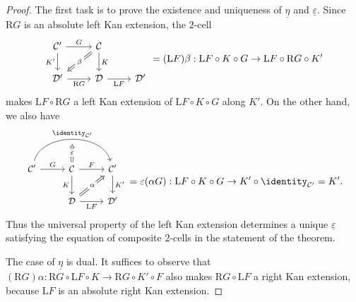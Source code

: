 \begin{proof}
	The first task is to prove the existence and uniqueness of
	$\underline{\eta}$ and $\underline{\varepsilon}$. Since $\mathrm{R}G$ is
	an absolute left Kan extension, the $2$-cell
	\[\begin{tikzcd}
		\mathcal{C}' \arrow[r, "G"] \arrow[d, "{K'}"'] & \mathcal{C} \arrow[d, "K"] \arrow[Rightarrow, ld, "\beta" description] & \\
		\mathcal{D}' \arrow[r, "{\mathrm{R}G}"'] & \mathcal{D} \arrow[r, "{\mathrm{L}F}"'] & \mathcal{D}'
	\end{tikzcd} = (\mathrm{L}F)\beta : \mathrm{L}F \circ K \circ G \to \mathrm{L}F \circ \mathrm{R}G \circ K' \]
	makes $\mathrm{L}F \circ \mathrm{R}G$ a left Kan extension of
	$\mathrm{L}F \circ K \circ G$ along $K'$. On the other hand, we also have
	\[\begin{tikzcd}[every cell/.append style = {font = \small}]
		\mathcal{C}' \arrow[r, "G"] \arrow[bend left=75, rr, "{\identity_{\mathcal{C}'}}", ""' {name=I}] & \mathcal{C} \arrow[r, "F"] \arrow[d, "K"'] \arrow[Rightarrow, to=I, "\varepsilon" description] & \mathcal{C}' \arrow[d, "{K'}"] \\
		& \mathcal{D} \arrow[r, "{\mathrm{L}F}"'] \arrow[Rightarrow, ru, "\alpha" description] & \mathcal{D}'
	\end{tikzcd} = \varepsilon(\alpha G) : \mathrm{L}F \circ K \circ G \to K' \circ \identity_{\mathcal{C}'} = K' . \]
	Thus the universal property of the left Kan extension determines a unique
	$\underline{\varepsilon}$ satisfying the equation of composite $2$-cells
	in the statement of the theorem.

	The case of $\underline{\eta}$ is dual. It suffices to observe that
	$(\mathrm{R}G)\alpha:
	\mathrm{R}G \circ \mathrm{L}F \circ K \to
	\mathrm{R}G \circ K' \circ F$ also makes
	$\mathrm{R}G \circ \mathrm{L}F$ a right Kan extension, because
	$\mathrm{L}F$ is an absolute right Kan extension.


\end{proof}
